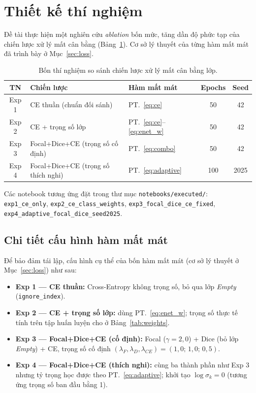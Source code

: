 \section{Thiết kế thí nghiệm}
\label{sec:experiment_design}

Đề tài thực hiện một nghiên cứu \textit{ablation} bốn mức, tăng dần độ phức tạp của
chiến lược xử lý mất cân bằng (Bảng~\ref{tab:experiments}). Cơ sở lý thuyết của từng
hàm mất mát đã trình bày ở Mục~\ref{sec:loss}.

\begin{table}[H]
\centering
\caption{Bốn thí nghiệm so sánh chiến lược xử lý mất cân bằng lớp.}
\label{tab:experiments}
\small
\begin{tabular}{c l l c c}
\toprule
\textbf{TN} & \textbf{Chiến lược} & \textbf{Hàm mất mát} & \textbf{Epochs} & \textbf{Seed} \\
\midrule
Exp 1 & CE thuần (chuẩn đối sánh) & PT.~\eqref{eq:ce} & 50 & 42 \\
Exp 2 & CE + trọng số lớp & PT.~\eqref{eq:ce}--\eqref{eq:enet_w} & 50 & 42 \\
Exp 3 & Focal+Dice+CE (trọng số cố định) & PT.~\eqref{eq:combo} & 50 & 42 \\
Exp 4 & Focal+Dice+CE (trọng số thích nghi) & PT.~\eqref{eq:adaptive} & 100 & 2025 \\
\bottomrule
\end{tabular}
\end{table}

\noindent Các notebook tương ứng đặt trong thư mục \texttt{notebooks/executed/}:
\texttt{exp1\_ce\_only}, \texttt{exp2\_ce\_class\_weights},
\texttt{exp3\_focal\_dice\_ce\_fixed}, \texttt{exp4\_adaptive\_focal\_dice\_seed2025}.

\subsection{Chi tiết cấu hình hàm mất mát}
Để bảo đảm tái lập, cấu hình cụ thể của bốn hàm mất mát (cơ sở lý thuyết ở
Mục~\ref{sec:loss}) như sau:
\begin{itemize}[leftmargin=1.4cm]
  \item \textbf{Exp 1 --- CE thuần:} Cross-Entropy không trọng số, bỏ qua lớp
  \textit{Empty} (\texttt{ignore\_index}).
  \item \textbf{Exp 2 --- CE + trọng số lớp:} dùng PT.~\eqref{eq:enet_w}; trọng số thực
  tế tính trên tập huấn luyện cho ở Bảng~\ref{tab:weights}.
  \item \textbf{Exp 3 --- Focal+Dice+CE (cố định):} Focal ($\gamma=2{,}0$) + Dice (bỏ
  lớp \textit{Empty}) + CE, trọng số cố định $(\lambda_F,\lambda_D,\lambda_{CE})=
  (1{,}0;\,1{,}0;\,0{,}5)$.
  \item \textbf{Exp 4 --- Focal+Dice+CE (thích nghi):} cùng ba thành phần như Exp 3
  nhưng tỷ trọng học được theo PT.~\eqref{eq:adaptive}; khởi tạo $\log\sigma_k=0$
  (tương ứng trọng số ban đầu bằng 1).
\end{itemize}

